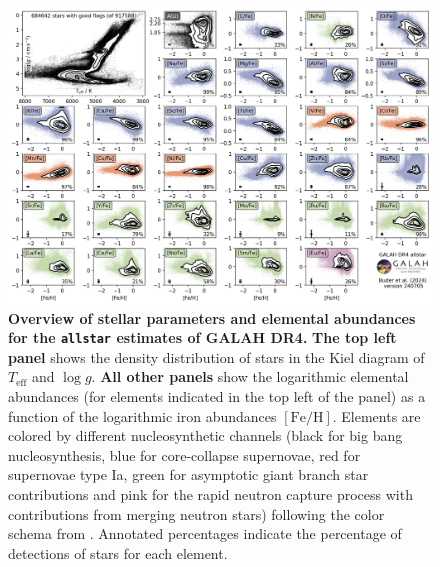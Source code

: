 \documentclass[
  journal=pasa,
  manuscript=research-paper, %
  year=2024,
  volume=37
]{cup-journal}
\newcommand{\Teff}{$T_\mathrm{eff}$\xspace}
\newcommand{\logg}{$\log g$\xspace}
\newcommand{\feh}{$\mathrm{[Fe/H]}$\xspace}
\begin{document}
\begin{landscape}
\begin{figure}[ht]
\includegraphics[width=0.975\columnwidth]{figures/galah_dr4_overview_allstar.png}
\caption{
\textbf{Overview of stellar parameters and elemental abundances for the \texttt{allstar} estimates of GALAH DR4.}
\textbf{The top left panel} shows the density distribution of stars in the Kiel diagram of \Teff and \logg.
\textbf{All other panels} show the logarithmic elemental abundances (for elements indicated in the top left of the panel) as a function of the logarithmic iron abundances \feh. Elements are colored by different nucleosynthetic channels (black for big bang nucleosynthesis, blue for core-collapse supernovae, red for supernovae type Ia, green for asymptotic giant branch star contributions and pink for the rapid neutron capture process with contributions from merging neutron stars) following the color schema from \citet{Kobayashi2020}. Annotated percentages indicate the percentage of detections of stars for each element.
}
\label{fig:galah_dr4_overview_allstar}
\end{figure}
\end{landscape}
\end{document}
